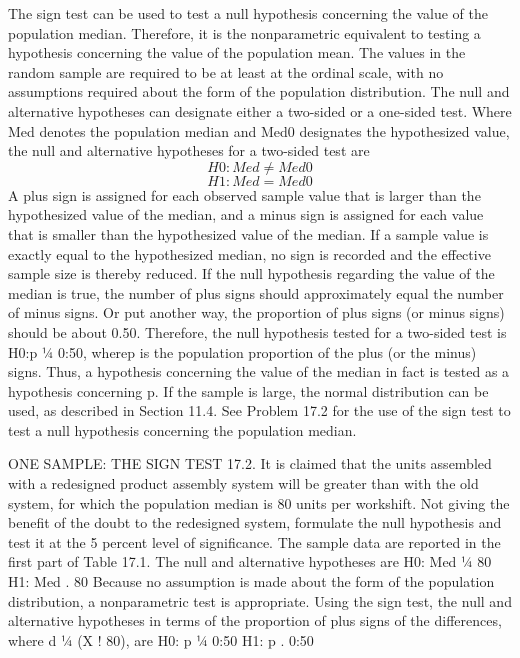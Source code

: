 The sign test can be used to test a null hypothesis concerning the value of the population median. Therefore,
it is the nonparametric equivalent to testing a hypothesis concerning the value of the population mean. The
values in the random sample are required to be at least at the ordinal scale, with no assumptions required about
the form of the population distribution.
The null and alternative hypotheses can designate either a two-sided or a one-sided test. Where Med
denotes the population median and Med0 designates the hypothesized value, the null and alternative hypotheses
for a two-sided test are
\[H0: Med \neq Med0\]
\[H1: Med = Med0\]
A plus sign is assigned for each observed sample value that is larger than the hypothesized value of the
median, and a minus sign is assigned for each value that is smaller than the hypothesized value of the median. If
a sample value is exactly equal to the hypothesized median, no sign is recorded and the effective sample size is
thereby reduced. If the null hypothesis regarding the value of the median is true, the number of plus signs should
approximately equal the number of minus signs. 
Or put another way, the proportion of plus signs (or minus
signs) should be about 0.50. Therefore, the null hypothesis tested for a two-sided test is H0:p ¼ 0:50, wherep is
the population proportion of the plus (or the minus) signs. Thus, a hypothesis concerning the value of the
median in fact is tested as a hypothesis concerning p. If the sample is large, the normal distribution can be used,
as described in Section 11.4.
See Problem 17.2 for the use of the sign test to test a null hypothesis concerning the population median.


ONE SAMPLE: THE SIGN TEST
17.2. It is claimed that the units assembled with a redesigned product assembly system will be greater than
with the old system, for which the population median is 80 units per workshift. Not giving the benefit of
the doubt to the redesigned system, formulate the null hypothesis and test it at the 5 percent level of
significance. The sample data are reported in the first part of Table 17.1.
The null and alternative hypotheses are
H0: Med ¼ 80
H1: Med . 80
Because no assumption is made about the form of the population distribution, a nonparametric test is
appropriate. Using the sign test, the null and alternative hypotheses in terms of the proportion of plus signs of the
differences, where d ¼ (X ! 80), are
H0: p ¼ 0:50
H1: p . 0:50
